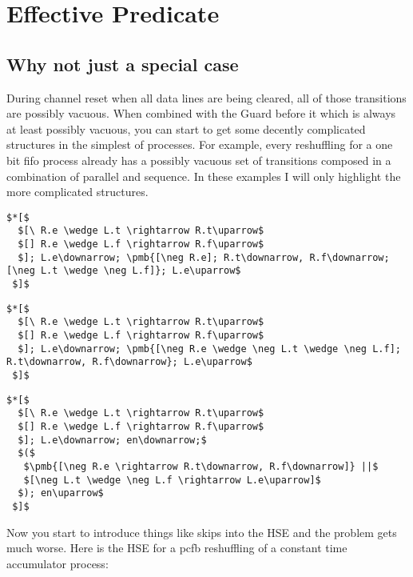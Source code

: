 \section{Effective Predicate}

\subsection{Why not just a special case}

During channel reset when all data lines are being cleared, all of those transitions are possibly vacuous. When combined with the Guard before it which is always at least possibly vacuous, you can start to get some decently complicated structures in the simplest of processes. For example, every reshuffling for a one bit fifo process already has a possibly vacuous set of transitions composed in a combination of parallel and sequence. In these examples I will only highlight the more complicated structures.

\begin{lstlisting}[caption={PCHB One Bit FIFO}]
$*[$
  $[\ R.e \wedge L.t \rightarrow R.t\uparrow$
  $[] R.e \wedge L.f \rightarrow R.f\uparrow$
  $]; L.e\downarrow; \pmb{[\neg R.e]; R.t\downarrow, R.f\downarrow; [\neg L.t \wedge \neg L.f]}; L.e\uparrow$
 $]$
\end{lstlisting}

\begin{lstlisting}[caption={WCHB One Bit FIFO}]
$*[$
  $[\ R.e \wedge L.t \rightarrow R.t\uparrow$
  $[] R.e \wedge L.f \rightarrow R.f\uparrow$
  $]; L.e\downarrow; \pmb{[\neg R.e \wedge \neg L.t \wedge \neg L.f]; R.t\downarrow, R.f\downarrow}; L.e\uparrow$
 $]$
\end{lstlisting}

\begin{lstlisting}[caption={PCFB One Bit FIFO}]
$*[$
  $[\ R.e \wedge L.t \rightarrow R.t\uparrow$
  $[] R.e \wedge L.f \rightarrow R.f\uparrow$
  $]; L.e\downarrow; en\downarrow;$
  $($
   $\pmb{[\neg R.e \rightarrow R.t\downarrow, R.f\downarrow]} ||$
   $[\neg L.t \wedge \neg L.f \rightarrow L.e\uparrow]$
  $); en\uparrow$ 
 $]$
\end{lstlisting}

Now you start to introduce things like skips into the HSE and the problem gets much worse. Here is the HSE for a pcfb reshuffling of a constant time accumulator process:

